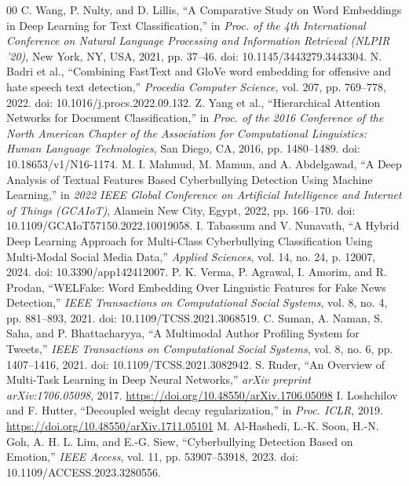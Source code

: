 \documentclass[journal]{IEEEtran}
\begin{document}
\begin{thebibliography}{00}
 C. Wang, P. Nulty, and D. Lillis, ``A Comparative Study on Word Embeddings in Deep Learning for Text Classification,'' in \textit{Proc. of the 4th International Conference on Natural Language Processing and Information Retrieval (NLPIR '20)}, New York, NY, USA, 2021, pp. 37--46. doi: 10.1145/3443279.3443304.
 N. Badri et al., ``Combining FastText and GloVe word embedding for offensive and hate speech text detection,'' \textit{Procedia Computer Science}, vol. 207, pp. 769--778, 2022. doi: 10.1016/j.procs.2022.09.132.
 Z. Yang et al., ``Hierarchical Attention Networks for Document Classification,'' in \textit{Proc. of the 2016 Conference of the North American Chapter of the Association for Computational Linguistics: Human Language Technologies}, San Diego, CA, 2016, pp. 1480--1489. doi: 10.18653/v1/N16-1174.
 M. I. Mahmud, M. Mamun, and A. Abdelgawad, ``A Deep Analysis of Textual Features Based Cyberbullying Detection Using Machine Learning,'' in \textit{2022 IEEE Global Conference on Artificial Intelligence and Internet of Things (GCAIoT)}, Alamein New City, Egypt, 2022, pp. 166--170. doi: 10.1109/GCAIoT57150.2022.10019058.
 I. Tabassum and V. Nunavath, ``A Hybrid Deep Learning Approach for Multi-Class Cyberbullying Classification Using Multi-Modal Social Media Data,'' \textit{Applied Sciences}, vol. 14, no. 24, p. 12007, 2024. doi: 10.3390/app142412007.
 P. K. Verma, P. Agrawal, I. Amorim, and R. Prodan, ``WELFake: Word Embedding Over Linguistic Features for Fake News Detection,'' \textit{IEEE Transactions on Computational Social Systems}, vol. 8, no. 4, pp. 881--893, 2021. doi: 10.1109/TCSS.2021.3068519.
 C. Suman, A. Naman, S. Saha, and P. Bhattacharyya, ``A Multimodal Author Profiling System for Tweets,'' \textit{IEEE Transactions on Computational Social Systems}, vol. 8, no. 6, pp. 1407--1416, 2021. doi: 10.1109/TCSS.2021.3082942.
 S. Ruder, ``An Overview of Multi-Task Learning in Deep Neural Networks,'' \textit{arXiv preprint arXiv:1706.05098}, 2017. \url{https://doi.org/10.48550/arXiv.1706.05098}
 I. Loshchilov and F. Hutter, ``Decoupled weight decay regularization,'' in \textit{Proc. ICLR}, 2019. \url{https://doi.org/10.48550/arXiv.1711.05101}
 M. Al-Hashedi, L.-K. Soon, H.-N. Goh, A. H. L. Lim, and E.-G. Siew, ``Cyberbullying Detection Based on Emotion,'' \textit{IEEE Access}, vol. 11, pp. 53907--53918, 2023. doi: 10.1109/ACCESS.2023.3280556.
\end{thebibliography}
\end{document}
